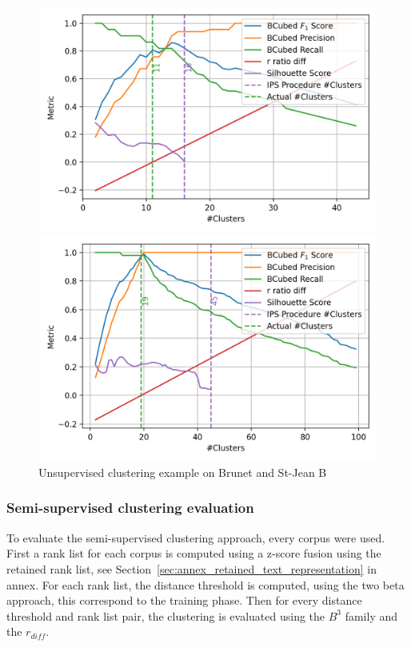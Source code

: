 \begin{figure}
  \caption{Unsupervised clustering example on Brunet and St-Jean B}
  \label{fig:unsupervised_clustering}

  \label{fig:unsupervised_clustering_brunet}
  \includegraphics[width=\linewidth]{img/unsupervised_clustering_brunet.png}

  \label{fig:unsupervised_clustering_st_jean_B}
  \includegraphics[width=\linewidth]{img/unsupervised_clustering_st_jean_B.png}
\end{figure}


\subsubsection{Semi-supervised clustering evaluation}

To evaluate the semi-supervised clustering approach, every corpus were used.
First a rank list for each corpus is computed using a z-score fusion using the retained rank list, see Section~\ref{sec:annex_retained_text_representation} in annex.
For each rank list, the distance threshold is computed, using the two beta approach, this correspond to the training phase.
Then for every distance threshold and rank list pair, the clustering is evaluated using the $B^3$ family and the $r_{diff}$.

